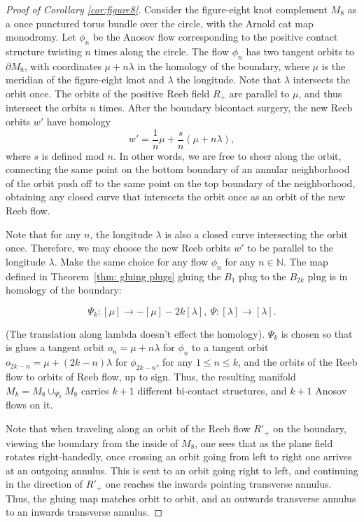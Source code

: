 \documentclass{amsart}
\theoremstyle{definition}
\theoremstyle{remark}
\begin{document}
\begin{proof}[Proof of Corollary \ref{cor:figure8}]
Consider the figure-eight knot complement $M_8$ as a once punctured torus bundle over the circle, with the Arnold cat map monodromy. Let $\phi_n$ be the Anosov flow corresponding to the positive contact structure twisting $n$ times along the circle.
The flow $\phi_n$ has two tangent orbits to $\partial M_8$, with coordinates $\mu+n\lambda$ in the homology of the boundary, where $\mu$ is the meridian of the figure-eight knot and $\lambda$ the longitude. 
Note that $\lambda$ intersects the orbit once.
The orbits of the positive Reeb field $R_+$ are parallel to $\mu$, and thus intersect the orbits $n$ times. After the boundary bicontact surgery, the new Reeb orbits $w'$ have homology 
\[
w'=\frac{1}{n}\mu+\frac{s}{n} (\mu+n\lambda),
\]
where $s$ is defined mod $n$. In other words, we are free to sheer along the orbit, connecting the same point on the bottom boundary of an annular neighborhood of the orbit push off to the same point on the top boundary of the neighborhood, obtaining any closed curve that intersects the orbit once as an orbit of the new Reeb flow.

Note that for any $n$, the longitude $\lambda$ is also a closed curve intersecting the orbit once. 
Therefore, we may choose the new Reeb orbits $w'$ to be parallel to the longitude $\lambda$. Make the same choice for any flow $\phi_n$ for any $n\in\mathbb{N}$. The map defined in Theorem~\ref{thm: gluing plugs} gluing the $B_1$ plug to the $B_{2k}$ plug is in homology of the boundary: 

\[
\Psi_k: [\mu]\to -[\mu]-2k[\lambda],\ \Psi:[\lambda]\to [\lambda].
\]

(The translation along lambda doesn't effect the homology).
$\Psi_k$ is chosen so that is glues a tangent orbit $o_n=\mu+n\lambda$ for $\phi_n$ to a tangent orbit $o_{2k-n}=\mu+(2k-n)\lambda$ for $\phi_{2k-n}$, for any $1\leq n\leq k$, and the orbits of the Reeb flow to orbits of Reeb flow, up to sign.
Thus, the resulting manifold $M_k=M_8\cup_{\Psi_k}M_8$ carries $k+1$ different bi-contact structures, and $k+1$ Anosov flows on it. 

Note that when traveling along an orbit of the Reeb flow $R'_+$ on the boundary, viewing the boundary from the inside of $M_8$, one sees that as the plane field rotates right-handedly, once crossing an orbit going from left to right one arrives at an outgoing annulus. This is sent to an orbit going right to left, and continuing in the direction of $R'_+$ one reaches the inwards pointing transverse annulus. Thus, the gluing map matches orbit to orbit, and an outwards transverse annulus to an inwards transverse annulus.


\end{proof}
\end{document}
